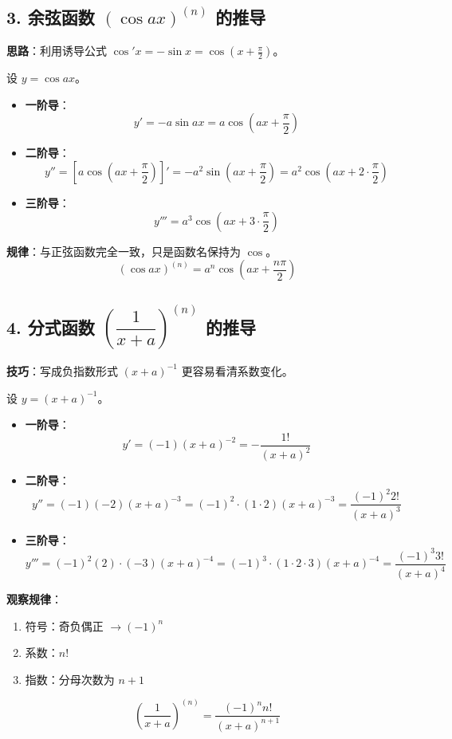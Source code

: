 \documentclass[12pt,a4paper]{article}
\begin{document}
\newpage
\subsection*{3. 余弦函数 $(\cos ax)^{(n)}$ 的推导}
\textbf{思路}：利用诱导公式 $\cos' x = -\sin x = \cos(x + \frac{\pi}{2})$。

\begin{derivebox}
设 $y = \cos ax$。
\begin{itemize}
    \item \textbf{一阶导}：
    \[ y' = -a \sin ax = a \cos\left(ax + \dfrac{\pi}{2}\right) \]
    
    \item \textbf{二阶导}：
    \[ y'' = \left[ a \cos\left(ax + \dfrac{\pi}{2}\right) \right]' = -a^2 \sin\left(ax + \dfrac{\pi}{2}\right) = a^2 \cos\left(ax + 2 \cdot \dfrac{\pi}{2}\right) \]
    
    \item \textbf{三阶导}：
    \[ y''' = a^3 \cos\left(ax + 3 \cdot \dfrac{\pi}{2}\right) \]
\end{itemize}
\textbf{规律}：与正弦函数完全一致，只是函数名保持为 $\cos$。
\[
\boxed{(\cos ax)^{(n)} = a^n \cos\left(ax + \dfrac{n\pi}{2}\right)}
\]
\end{derivebox}


\newpage

\subsection*{4. 分式函数 $\left(\dfrac{1}{x+a}\right)^{(n)}$ 的推导}
\textbf{技巧}：写成负指数形式 $(x+a)^{-1}$ 更容易看清系数变化。

\begin{derivebox}
设 $y = (x+a)^{-1}$。
\begin{itemize}
    \item \textbf{一阶导}：
    \[ y' = (-1)(x+a)^{-2} = -\dfrac{1!}{(x+a)^2} \]
    
    \item \textbf{二阶导}：
    \[ y'' = (-1)(-2)(x+a)^{-3} = (-1)^2 \cdot (1 \cdot 2) (x+a)^{-3} = \dfrac{(-1)^2 2!}{(x+a)^3} \]
    
    \item \textbf{三阶导}：
    \[ y''' = (-1)^2 (2) \cdot (-3)(x+a)^{-4} = (-1)^3 \cdot (1 \cdot 2 \cdot 3) (x+a)^{-4} = \dfrac{(-1)^3 3!}{(x+a)^4} \]
\end{itemize}
\textbf{观察规律}：
\begin{enumerate}
    \item 符号：奇负偶正 $\to (-1)^n$
    \item 系数：$n!$
    \item 指数：分母次数为 $n+1$
\end{enumerate}
\[
\boxed{\left(\dfrac{1}{x+a}\right)^{(n)} = \dfrac{(-1)^n n!}{(x+a)^{n+1}}}
\]
\end{derivebox}
\end{document}
